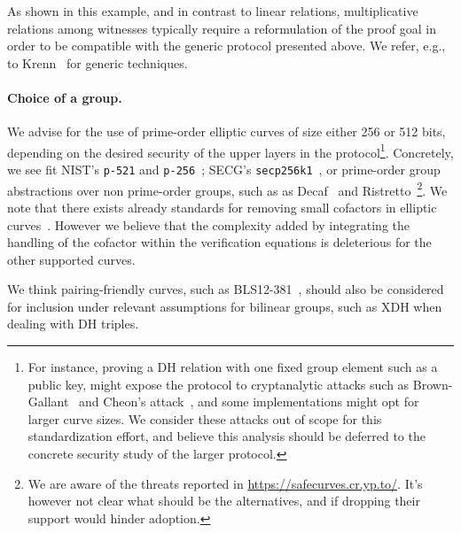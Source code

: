 \documentclass[runningheads,11pt]{article}
\begin{document}
As shown in this example, and in contrast to linear relations, multiplicative relations among witnesses typically require a reformulation of the proof goal in order to be compatible with the generic protocol presented above.
We refer, e.g., to Krenn~\cite{krenn12} for generic techniques.



\paragraph{Choice of a group.} We advise for the use of prime-order elliptic curves of size either 256 or 512 bits, depending on the desired security of the upper layers in the protocol\footnote{For instance, proving a DH relation with one fixed group element such as a public key, might expose the protocol to cryptanalytic attacks such as Brown-Gallant~\cite{EPRINT:BroGal04} and Cheon’s attack~\cite{EC:Cheon06}, and some implementations might opt for larger curve sizes. We consider these attacks out of scope for this standardization effort, and believe this analysis should be deferred to the concrete security study of the larger protocol.}.
Concretely, we see fit NIST's \verb|p-521| and \verb|p-256|~\cite{fips2}; SECG's \verb|secp256k1|~\cite{SECG}, or prime-order group abstractions over non prime-order groups, such as as Decaf~\cite{C:Hamburg15} and Ristretto~\cite{cfrg-ristretto-decaf}\footnote{We are aware of the threats reported in
\url{https://safecurves.cr.yp.to/}.
It's however not clear what should be the alternatives, and if dropping their support would hinder adoption.
}.
We note that there exists already standards for removing small cofactors in elliptic curves~\cite{rfc2785}.
However we believe that the complexity added by integrating the handling of the cofactor within the verification equations is deleterious for the other supported curves.

We think pairing-friendly curves, such as BLS12-381~\cite{bls12}, should also be considered for inclusion under relevant assumptions for bilinear groups, such as XDH when dealing with DH triples.
\end{document}
